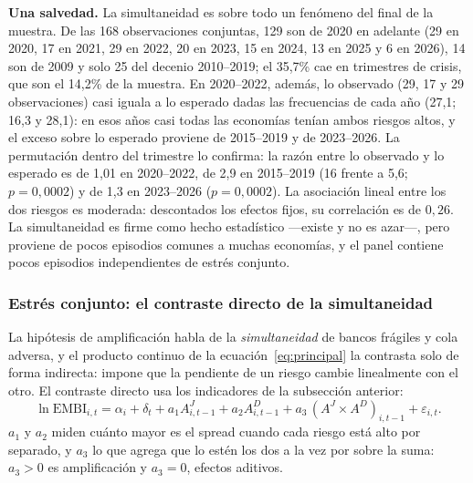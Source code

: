 \textbf{Una salvedad.} La simultaneidad es sobre todo un fenómeno del final de la muestra. De las 168 observaciones conjuntas, 129 son de 2020 en adelante (29 en 2020, 17 en 2021, 29 en 2022, 20 en 2023, 15 en 2024, 13 en 2025 y 6 en 2026), 14 son de 2009 y solo 25 del decenio 2010--2019; el 35,7\% cae en trimestres de crisis, que son el 14,2\% de la muestra. En 2020--2022, además, lo observado (29, 17 y 29 observaciones) casi iguala a lo esperado dadas las frecuencias de cada año (27,1; 16,3 y 28,1): en esos años casi todas las economías tenían ambos riesgos altos, y el exceso sobre lo esperado proviene de 2015--2019 y de 2023--2026. La permutación dentro del trimestre lo confirma: la razón entre lo observado y lo esperado es de 1,01 en 2020--2022, de 2,9 en 2015--2019 (16 frente a 5,6; $p=0{,}0002$) y de 1,3 en 2023--2026 ($p=0{,}0002$). La asociación lineal entre los dos riesgos es moderada: descontados los efectos fijos, su correlación es de $0{,}26$. La simultaneidad es firme como hecho estadístico ---existe y no es azar---, pero proviene de pocos episodios comunes a muchas economías, y el panel contiene pocos episodios independientes de estrés conjunto.

\subsubsection{Estrés conjunto: el contraste directo de la simultaneidad}
\label{sec:estres-conjunto}

La hipótesis de amplificación habla de la \emph{simultaneidad} de bancos frágiles y cola adversa, y el producto continuo de la ecuación~\eqref{eq:principal} la contrasta solo de forma indirecta: impone que la pendiente de un riesgo cambie linealmente con el otro. El contraste directo usa los indicadores de la subsección anterior:
\begin{equation}
\ln\mathrm{EMBI}_{i,t}=\alpha_i+\delta_t+a_1A^{J}_{i,t-1}+a_2A^{D}_{i,t-1}+a_3\,(A^{J}\times A^{D})_{i,t-1}+\varepsilon_{i,t}.
\label{eq:estres}
\end{equation}
$a_1$ y $a_2$ miden cuánto mayor es el spread cuando cada riesgo está alto por separado, y $a_3$ lo que agrega que lo estén los dos a la vez por sobre la suma: $a_3>0$ es amplificación y $a_3=0$, efectos aditivos.

